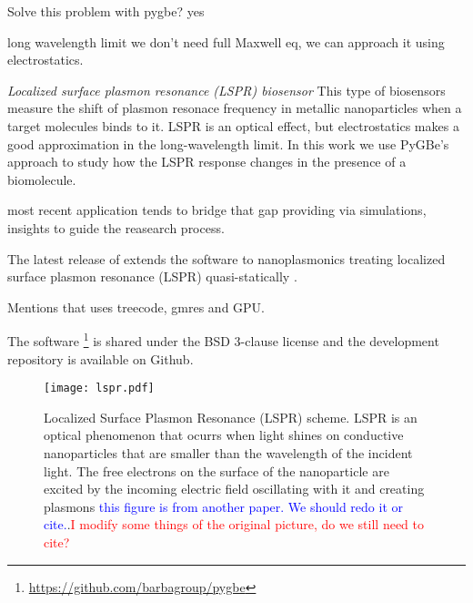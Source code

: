 Solve this problem with pygbe? yes

long wavelength limit we don't need full Maxwell eq, we can approach it using
electrostatics.

\item{\textit{Localized surface plasmon resonance (LSPR) biosensor} This type
of biosensors measure the shift of plasmon resonace frequency in metallic nanoparticles
when a target molecules binds to it. LSPR is an optical effect, but electrostatics 
makes a good approximation in the long-wavelength limit. In this work we use
PyGBe's approach to study how the LSPR response changes in the presence of a 
biomolecule.}


\pygbe most recent 
application \cite{ClementiETal2017} tends to bridge that gap providing via
simulations, insights to guide the reasearch process. 

The latest release of \pygbe
extends the software to nanoplasmonics treating localized surface plasmon 
resonance (LSPR) quasi-statically \cite{MayergoyzZhang2007}.

Mentions that uses treecode, gmres and GPU. 

The software \footnote{\url{https://github.com/barbagroup/pygbe}} is shared 
under the BSD 3-clause license and the development repository is available on 
Github.












\begin{figure}[h] %
   \centering
   \texttt{[image: lspr.pdf]} 
   \caption{Localized Surface Plasmon Resonance (LSPR) scheme. LSPR is an 
            optical phenomenon that ocurrs when light shines on conductive 
            nanoparticles that are smaller than the wavelength of the incident 
            light. The free electrons on the surface of the nanoparticle are 
            excited by the incoming electric field oscillating with it and 
            creating plasmons \textcolor{blue}{this figure is from another paper. We should redo it or cite.}.\textcolor{red}{I modify some things of the original picture, do we still need to cite?}}
   \label{fig:lspr}
\end{figure}




